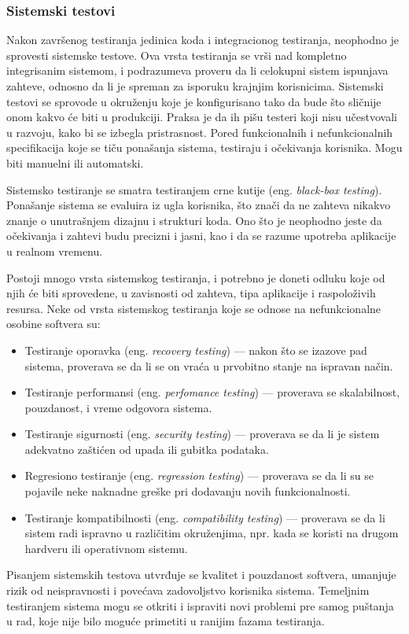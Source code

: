 \documentclass[12pt,oneside]{memoir}
\begin{document}
\subsubsection{Sistemski testovi}
\label{sec:system}
\par Nakon završenog testiranja jedinica koda i integracionog testiranja, neophodno je sprovesti sistemske testove. Ova vrsta testiranja se vrši nad kompletno integrisanim sistemom, i podrazumeva proveru da li celokupni sistem ispunjava zahteve, odnosno da li je spreman za isporuku krajnjim korisnicima. Sistemski testovi se sprovode u okruženju koje je konfigurisano tako da bude što sličnije onom kakvo će biti u produkciji. Praksa je da ih pišu testeri koji nisu učestvovali u razvoju, kako bi se izbegla pristrasnost. Pored funkcionalnih i nefunkcionalnih specifikacija koje se tiču ponašanja sistema, testiraju i očekivanja korisnika. Mogu biti manuelni ili automatski. 
\par Sistemsko testiranje se smatra testiranjem crne kutije (eng. \emph{black-box testing}). Ponašanje sistema se evaluira iz ugla korisnika, što znači da ne zahteva nikakvo znanje o unutrašnjem dizajnu i strukturi koda. Ono što je neophodno jeste da očekivanja i zahtevi budu precizni i jasni, kao i da se razume upotreba aplikacije u realnom vremenu. 
\par Postoji mnogo vrsta sistemskog testiranja, i potrebno je doneti odluku koje od njih će biti sprovedene, u zavisnosti od zahteva, tipa aplikacije i raspoloživih resursa.  Neke od vrsta sistemskog testiranja koje se odnose na nefunkcionalne osobine softvera su: 
\begin{itemize}
\item Testiranje oporavka (eng. \emph{recovery testing}) --- nakon što se izazove pad sistema, proverava se da li se on vraća u prvobitno stanje na ispravan način.
\item Testiranje performansi (eng. \emph{perfomance testing}) --- proverava se skalabilnost, pouzdanost, i vreme odgovora sistema.
\item Testiranje sigurnosti (eng. \emph{security testing}) --- proverava se da li je sistem adekvatno zaštićen od upada ili gubitka podataka. 
\item Regresiono testiranje (eng. \emph{regression testing}) --- proverava se da li su se pojavile neke naknadne greške pri dodavanju novih funkcionalnosti. 
\item Testiranje kompatibilnosti (eng. \emph{compatibility testing}) --- proverava se da li sistem radi ispravno u različitim okruženjima, npr. kada se koristi na drugom hardveru ili operativnom sistemu.
\end{itemize}
\par Pisanjem sistemskih testova utvrđuje se kvalitet i pouzdanost softvera, umanjuje rizik od neispravnosti i povećava zadovoljstvo korisnika sistema. Temeljnim testiranjem sistema mogu se otkriti i ispraviti novi problemi pre samog puštanja u rad, koje nije bilo moguće primetiti u ranijim fazama testiranja. 
\end{document}
